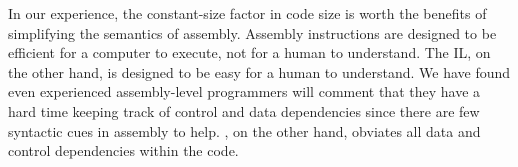 In our experience, the constant-size factor in code size is worth the
benefits of simplifying the semantics of assembly.  Assembly
instructions are designed to be efficient for a computer to execute,
not for a human to understand. The IL, on the other hand, is designed
to be easy for a human to understand.  We have found even experienced
assembly-level programmers will comment that they have a hard time
keeping track of control and data dependencies since there are few
syntactic cues in assembly to help. \bap, on the other hand, obviates
all data and control dependencies within the code. 




